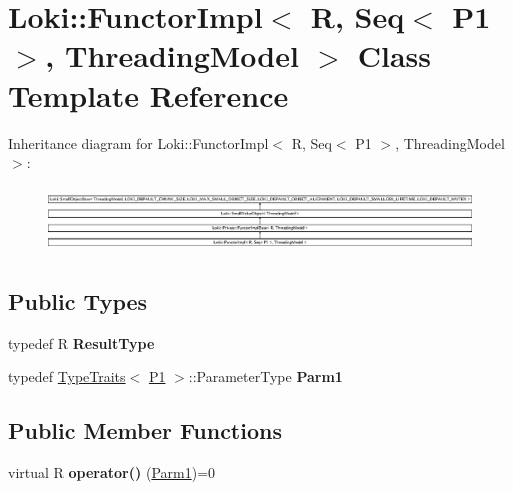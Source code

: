 \hypertarget{classLoki_1_1FunctorImpl_3_01R_00_01Seq_3_01P1_01_4_00_01ThreadingModel_01_4}{}\section{Loki\+:\+:Functor\+Impl$<$ R, Seq$<$ P1 $>$, Threading\+Model $>$ Class Template Reference}
\label{classLoki_1_1FunctorImpl_3_01R_00_01Seq_3_01P1_01_4_00_01ThreadingModel_01_4}
Inheritance diagram for Loki\+:\+:Functor\+Impl$<$ R, Seq$<$ P1 $>$, Threading\+Model $>$\+:\begin{figure}[H]
\begin{center}
\leavevmode
\includegraphics[height=1.751368cm]{classLoki_1_1FunctorImpl_3_01R_00_01Seq_3_01P1_01_4_00_01ThreadingModel_01_4}
\end{center}
\end{figure}
\subsection*{Public Types}
\begin{DoxyCompactItemize}
\item 
\hypertarget{classLoki_1_1FunctorImpl_3_01R_00_01Seq_3_01P1_01_4_00_01ThreadingModel_01_4_a3c91fdd241903cf46a9ec1bcbfe4fccd}{}typedef R {\bfseries Result\+Type}\label{classLoki_1_1FunctorImpl_3_01R_00_01Seq_3_01P1_01_4_00_01ThreadingModel_01_4_a3c91fdd241903cf46a9ec1bcbfe4fccd}

\item 
\hypertarget{classLoki_1_1FunctorImpl_3_01R_00_01Seq_3_01P1_01_4_00_01ThreadingModel_01_4_a5462baaffd9cad84f1e4d79161766111}{}typedef \hyperlink{classLoki_1_1TypeTraits}{Type\+Traits}$<$ \hyperlink{structP1}{P1} $>$\+::Parameter\+Type {\bfseries Parm1}\label{classLoki_1_1FunctorImpl_3_01R_00_01Seq_3_01P1_01_4_00_01ThreadingModel_01_4_a5462baaffd9cad84f1e4d79161766111}

\end{DoxyCompactItemize}
\subsection*{Public Member Functions}
\begin{DoxyCompactItemize}
\item 
\hypertarget{classLoki_1_1FunctorImpl_3_01R_00_01Seq_3_01P1_01_4_00_01ThreadingModel_01_4_a6869bf8948edf6d65371348e3066c60b}{}virtual R {\bfseries operator()} (\hyperlink{classLoki_1_1EmptyType}{Parm1})=0\label{classLoki_1_1FunctorImpl_3_01R_00_01Seq_3_01P1_01_4_00_01ThreadingModel_01_4_a6869bf8948edf6d65371348e3066c60b}

\end{DoxyCompactItemize}
